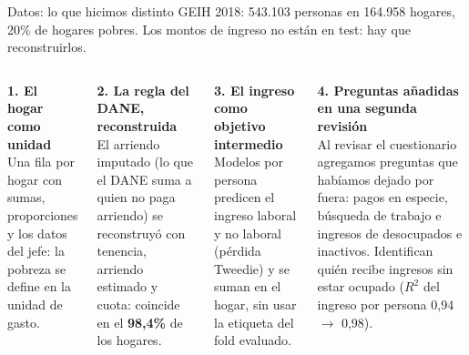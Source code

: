 \documentclass[aspectratio=169,10pt,xcolor=table]{beamer}
\newcommand{\tema}[1]{\textbf{#1}}
\begin{document}
\begin{frame}{Datos: lo que hicimos distinto}
\small
GEIH 2018: 543.103 personas en 164.958 hogares, 20\% de hogares pobres. Los
montos de ingreso no están en test: hay que reconstruirlos.
\vspace{3mm}

\begin{columns}[T]
\tema{1. El hogar como unidad}\\
\footnotesize Una fila por hogar con sumas, proporciones y los datos del
jefe: la pobreza se define en la unidad de gasto.

\vspace{3mm}
\small\tema{2. La regla del DANE, reconstruida}\\
\footnotesize El arriendo imputado (lo que el DANE suma a quien no paga
arriendo) se reconstruyó con tenencia, arriendo estimado y cuota:
coincide en el \textbf{98,4\%} de los hogares.

\tema{3. El ingreso como objetivo intermedio}\\
\footnotesize Modelos por persona predicen el ingreso laboral y no laboral
(pérdida Tweedie) y se suman en el hogar, sin usar la etiqueta del fold
evaluado.

\vspace{3mm}
\small\tema{4. Preguntas añadidas en una segunda revisión}\\
\footnotesize Al revisar el cuestionario agregamos preguntas que habíamos
dejado por fuera: pagos en especie, búsqueda de trabajo e ingresos de
desocupados e inactivos. Identifican quién recibe ingresos sin estar
ocupado ($R^2$ del ingreso por persona 0,94 $\to$ 0,98).
\end{columns}
\end{frame}
\end{document}
